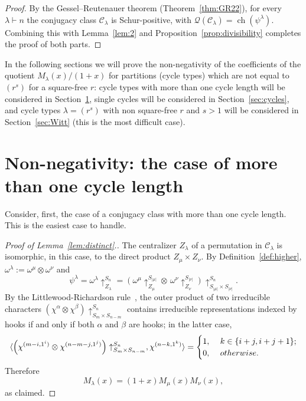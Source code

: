 \documentclass[ALCO,published]{cedram}
\newcommand{\Q}{\mathcal Q}
\newcommand{\C}{\mathcal C}
\newcommand{\ch}{{\operatorname{ch}}}
\begin{document}
\begin{proof}
    By the Gessel--Reutenauer theorem (Theorem~\ref{thm:GR22}), for every $\lambda\vdash n$ the conjugacy class $\C_\lambda$ 
    is Schur-positive, with $\Q(\C_\lambda) = \ch(\psi^\lambda)$.
    Combining this with Lemma~\ref{lem:2}  and  Proposition~\ref{prop:divisibility} completes the proof of both parts.
\end{proof}

In the following sections we will prove the non-negativity of the coefficients of the quotient $M_\lambda(x)/(1+x)$ for partitions (cycle types) which are not equal to $(r^s)$ for a square-free $r$: 
cycle types with more than one cycle length will be considered in Section~\ref{sec:distinct}, 
single cycles will be considered in Section~\ref{sec:cycles},
and cycle types $\lambda = (r^s)$ with non square-free $r$ and $s>1$ will be considered in Section~\ref{sec:Witt} (this is the most difficult case).


\section{Non-negativity: the case of more than one cycle length}
\label{sec:distinct}

Consider, first, the case of a conjugacy class with more than one cycle length. This is the easiest case to handle.

\begin{proof}[Proof of Lemma~\ref{lem:distinct}.]
    The centralizer $Z_\lambda$ of a permutation in $\C_\lambda$ is isomorphic, in this case, to the direct product $Z_\mu \times Z_\nu$. 
    By Definition~\ref{def:higher}, 
    $\omega^\lambda := \omega^{\mu} \otimes \omega^\nu$ and  
    \begin{equation}\label{eq:distinct}
        \psi^\lambda 
        = \omega^\lambda\uparrow_{Z_\lambda}^{S_n}
        = \left(\omega^{\mu}\uparrow_{Z_{\mu}}^{S_{|\mu|}} \otimes \, 
		\omega^{\nu}\uparrow_{Z_{\nu}}^{S_{|\nu|}}\right)
		\uparrow_{S_{|\mu|}\times S_{|\nu|}}^{S_n}.		    
    \end{equation}
    By the Littlewood-Richardson rule~\cite[Theorem A1.3.3]{EC2}, the outer product  of two irreducible characters 
    $\left( \chi^\alpha\otimes\chi^\beta\right)\uparrow_{S_m\times S_{n-m}}^{S_n}$ 
    contains irreducible representations indexed by hooks if and only if both $\alpha$ and $\beta$ are hooks; in the latter case,
    \[
        \langle \left( \chi^{(m-i,1^i)} \otimes \chi^{(n-m-j,1^j)}\right)\uparrow_{S_m \times S_{n-m}}^{S_n}, \chi^{(n-k,1^k)}\rangle = 
        \begin{cases}
            1, & \ k\in \{i+j, i+j+1\};\\
            0, & \ \rm{otherwise.}
        \end{cases}
    \]
    Therefore
    \[
        M_\lambda(x) = (1+x) M_\mu(x) M_\nu(x),
    \]
    as claimed.
\end{proof}	
\end{document}

